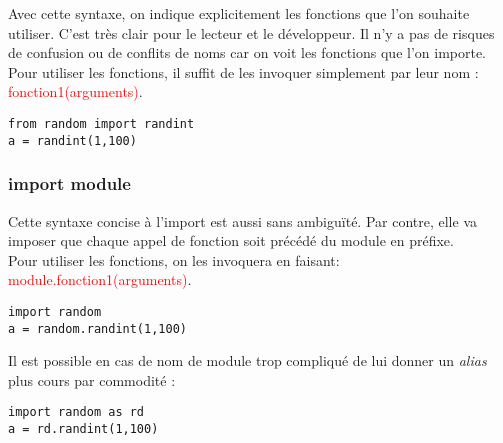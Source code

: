 \documentclass[12pt,fleqn]{book} %
\begin{document}
Avec cette syntaxe, on indique explicitement les fonctions que l'on souhaite utiliser. C'est très clair pour le lecteur et le développeur. Il n'y a pas de risques de confusion ou de conflits de noms car on voit les fonctions que l'on importe. \\

Pour utiliser les fonctions, il suffit de les invoquer simplement par leur nom : \textcolor{red}{fonction1(arguments)}.

\begin{center}
	\begin{varwidth}[t]{.5\textwidth}
		\begin{lstlisting}[language=iPython,linewidth = 15cm]
from random import randint
a = randint(1,100)\end{lstlisting}
\end{varwidth}\end{center} 

\subsubsection{import module}

Cette syntaxe concise à l'import est aussi sans ambiguïté. Par contre, elle va imposer que chaque appel de fonction soit précédé du module en préfixe. \\

Pour utiliser les fonctions, on les invoquera en faisant: \textcolor{red}{module.fonction1(arguments)}.

\begin{center}
	\begin{varwidth}[t]{.5\textwidth}
		\begin{lstlisting}[language=iPython,linewidth = 15cm]
import random
a = random.randint(1,100)\end{lstlisting}
\end{varwidth}\end{center}

Il est possible en cas de nom de module trop compliqué de lui donner un \textit{alias} plus cours par commodité :

\begin{center}
	\begin{varwidth}[t]{.5\textwidth}
		\begin{lstlisting}[language=iPython,linewidth = 15cm]
import random as rd
a = rd.randint(1,100)\end{lstlisting}
\end{varwidth}\end{center} 
\end{document}

